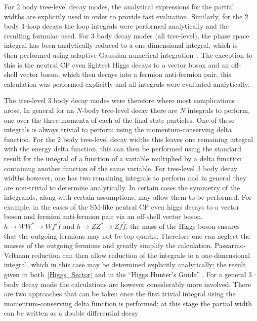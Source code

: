 \documentclass[final,3p,times]{elsarticle}
\begin{document}
For 2 body tree-level decay modes, the analytical expressions for the partial widths are explicitly used in order to
provide fast evaluation. Similarly, for the 2 body 1-loop decays the loop integrals were
performed analytically and the resulting formulae used.
For 3 body decay modes (all tree-level), the phase space integral
has been  analytically reduced to a one-dimensional integral, which is then
performed using adaptive Gaussian numerical integration~\cite{numRec}. The 
exception to this is the neutral CP even lightest Higgs decays to a vector
boson 
and an off-shell vector boson, which then decays into a fermion anti-fermion
pair, this calculation was performed explicitly and all integrals were
evaluated analytically. 

The tree-level 3 body decay modes were therefore where most complications arose. 
In general for an $N$-body tree-level decay there are $N$ integrals to perform,
one over the three-momenta of each of the final state particles. One of
these integrals is always trivial to perform using the momentum-conserving
delta function. For the 2 body tree-level decay widths this leaves one
remaining  integral with the energy delta function, this can then be performed
using 
the standard result for the integral of a function of a variable multiplied by
a delta function containing another function of the same variable. For
tree-level 3 body decay
widths however, one has two remaining integrals to perform and in general they are 
non-trivial to determine analytically. In certain cases the symmetry of
the integrands, along with certain assumptions, may allow them to be performed.
For example, in the cases of the SM-like neutral CP even higgs decays to a vector
boson and fermion anti-fermion pair via an off-shell vector boson,
$h \rightarrow WW^* \rightarrow W f' \bar{f}$ and 
$h \rightarrow ZZ^* \rightarrow Z f \bar{f}$, the
mass of the Higgs boson ensures that the outgoing fermions may not be top 
quarks. Therefore one can neglect the masses of the outgoing fermions and
greatly simplify the calculation. Passarino-Veltman reduction \cite{Passarino:1979} can then 
allow reduction of the integrals to a one-dimensional integral, which in 
this case may be determined explicitly analytically; the result given
in both~\ref{Higgs_Sector} and in the ``Higgs Hunter's Guide'' \cite{HHG}.
For a general 3 body decay mode the calculations are however considerably
more involved. There are two approaches that can be taken once the first
trivial integral using the momentum-conserving delta function is performed;
at this stage the partial width can be written as a double differential decay
\end{document}
